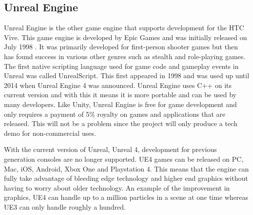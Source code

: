 \subsection{Unreal Engine}
Unreal Engine is the other game engine that supports development for the HTC Vive. This game engine is developed by Epic Games and was initially released on July 1998 \cite{unrealwiki}. It was primarily developed for first-person shooter games but then has found success in various other genres such as stealth and role-playing games. The first native scripting language used for game code and gameplay events in Unreal was called UnrealScript. This first appeared in 1998 and was used up until 2014 when Unreal Engine 4 was announced. Unreal Engine uses C++ on its current version and with this it means it is more portable and can be used by many developers. Like Unity, Unreal Engine is free for game development and only requires a payment of 5\% royalty on games and applications that are released\cite{whatisunreal}. This will not be a problem since the project will only produce a tech demo for non-commercial uses.
\newline
\par
With the current version of Unreal, Unreal 4, development for previous generation consoles are no longer supported. UE4 games can be released on PC, Mac, iOS, Android, Xbox One and Playstation 4\cite{unreal4nextgen}. This means that the engine can fully take advantage of bleeding edge technology and higher end graphics without having to worry about older technology. An example of the improvement in graphics, UE4 can handle up to a million particles in a scene at one time whereas UE3 can only handle roughly a hundred.

